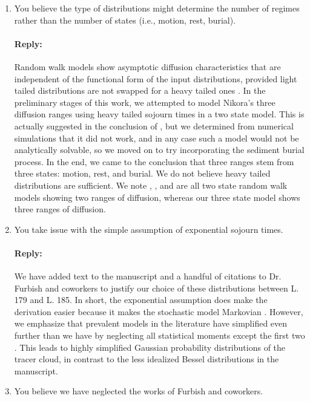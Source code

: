 \documentclass[11pt]{article}
\begin{document}
\begin{enumerate}
\item You believe the type of distributions might determine the number of regimes rather than the number of states (i.e., motion, rest, burial).

\paragraph{Reply:}
Random walk models show asymptotic diffusion characteristics that are independent of the functional form of the input distributions, provided light tailed distributions are not swapped for a heavy tailed ones \citep{Weiss1994,Weeks1998}.
In the preliminary stages of this work, we attempted to model Nikora's three diffusion ranges using heavy tailed sojourn times in a two state model. This is actually suggested in the conclusion of \citet{Nikora2001a}, but we determined from numerical simulations that it did not work, and in any case such a model would not be analytically solvable, so we moved on to try incorporating the sediment burial process. In the end, we came to the conclusion that three ranges stem from three states: motion, rest, and burial. We do not believe heavy tailed distributions are sufficient.
We note \citet{Lisle1998}, \citet{Lajeunesse2018}, and \citet{Wu2019} are all two state random walk models showing two ranges of diffusion, whereas our three state model shows three ranges of diffusion.

\item You take issue with the simple assumption of exponential sojourn times.

\paragraph{Reply:}
We have added text to the manuscript and a handful of citations to Dr. Furbish and coworkers to justify our choice of these distributions between L. 179 and L. 185.
In short, the exponential assumption does make the derivation easier because it makes the stochastic model Markovian \citep[e.g.,][]{Cox1965}. However, we emphasize that prevalent models in the literature have simplified even further than we have by neglecting all statistical moments except the first two \citep[e.g.][]{Wu2019}. This leads to highly simplified Gaussian probability distributions of the tracer cloud, in contrast to the less idealized Bessel distributions in the manuscript.

\item You believe we have neglected the works of Furbish and coworkers.

\end{enumerate}
\end{document}
